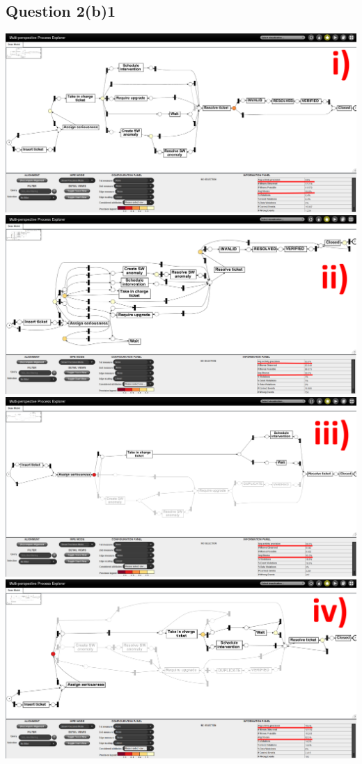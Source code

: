\documentclass[12pt]{article}
\begin{document}
\subsection*{Question 2(b)1}
\includegraphics[width=\columnwidth]{Question_2/img/ProM_b_PRE_i.png}\\
\includegraphics[width=\columnwidth]{Question_2/img/ProM_b_PRE_ii.png}\\
\includegraphics[width=\columnwidth]{Question_2/img/ProM_b_POST_iii.png}\\
\includegraphics[width=\columnwidth]{Question_2/img/ProM_b_POST_iv.png}\\
\end{document}
